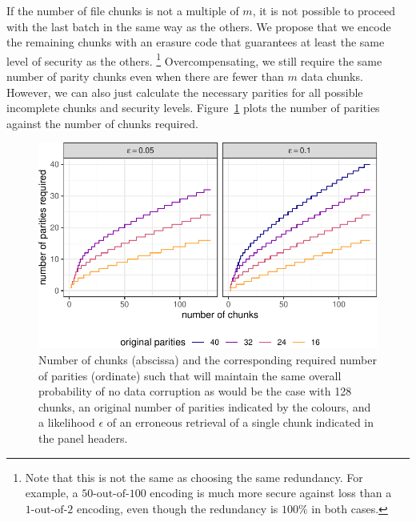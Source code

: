 \documentclass[manuscript,screen,review]{acmart}
\begin{document}
If the number of file chunks is not a multiple of $m$, it is not possible to proceed with the last batch in the same way as the others. We propose that we encode the remaining chunks with an erasure code that guarantees at least the same level of security as the others.%
%
\footnote{Note that this is not the same as choosing the same redundancy. For example, a $50\text{-out-of-}100$ encoding is much more secure against loss than a $1\text{-out-of-}2$ encoding, even though the redundancy is $100\%$ in both cases.}
%
Overcompensating, we still require the same number of parity chunks even when there are fewer than $m$ data chunks. However, we can also just calculate the necessary parities for all possible incomplete chunks and security levels. Figure~\ref{fig:maintain} plots the number of parities against the number of chunks required.
%
\begin{figure}[!ht]
  \centering
  \includegraphics[width=.8\textwidth]{figs/fig-maintain-1.pdf}
  \Description[]{}\caption{Number of chunks (abscissa) and the corresponding required number of parities (ordinate) such that will maintain the same overall probability of no data corruption as would be the case with 128 chunks, an original number of parities indicated by the colours, and a likelihood $\epsilon$ of an erroneous retrieval of a single chunk indicated in the panel headers.}
  \label{fig:maintain}
\end{figure}
\end{document}
